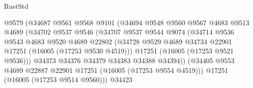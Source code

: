 \begin{lexlean}{RustStd}
\begin{coremodule}
                                    @9579
                                    (@34687
                                      @9561
                                      @9568
                                      @9101
                                      (@34694
                                        @9548
                                        @9560
                                        @9567
                                        @4683
                                        @9513
                                        @4689
                                        (@34702
                                          @9537
                                          @9546
                                          (@34707
                                            @9537
                                            @9544
                                            @9074
                                            (@34714
                                              @9536
                                              @9543
                                              @4683
                                              @9520
                                              @4689
                                              @22802
                                              (@34728
                                                @9529
                                                @4689
                                                @34734
                                                @22901
                                                @17251
                                                (@16005 (@17253 @9530 @4519)))
                                              @17251
                                              (@16005 (@17253 @9521 @9536)))
                                            @34373
                                            @34376
                                            @34379
                                            @34383
                                            @34388
                                            @34394))
                                        (@34405
                                          @9553
                                          @4689
                                          @22887
                                          @22901
                                          @17251
                                          (@16005 (@17253 @9554 @4519)))
                                        @17251
                                        (@16005 (@17253 @9514 @9560)))
                                      @34423

\end{coremodule}
\end{lexlean}
